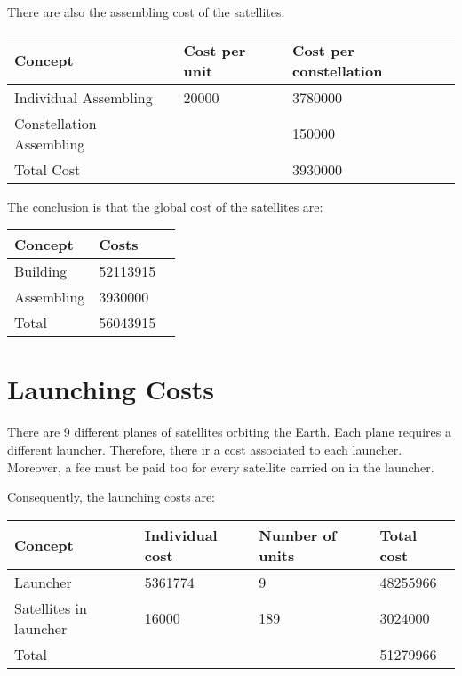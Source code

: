 There are also the assembling cost of the satellites:


\begin{center}
\begin{tabular}{ | l | l | l | }
\toprule
\hline
\rowcolor[gray]{0.75}
	Concept & Cost per unit & Cost per constellation \\ \hline
	Individual Assembling & 20000 & 3780000 \\ \hline
	Constellation Assembling &  & 150000 \  \\ \hline
	\rowcolor[gray]{0.65}
	Total Cost &  & 3930000 \  \\ \hline
	\bottomrule
\end{tabular}
\end{center}

The conclusion is that the global cost of the satellites are:
\begin{center}
\begin{tabular}{ | l | l | }
\toprule
\hline
\rowcolor[gray]{0.75}
	Concept & Costs  \ \\ \hline
	Building & 52113915 \\ \hline
	Assembling & 3930000 \\ \hline
	\rowcolor[gray]{0.65}
	Total & 56043915 \ \\ \hline
	\bottomrule
\end{tabular}
\end{center}



\section{Launching Costs}
There are 9 different planes of satellites orbiting the Earth. Each plane requires a different launcher. Therefore, there ir a cost associated to each launcher. Moreover, a fee must be paid too for every satellite carried on in the launcher. 

Consequently, the launching costs are:

\begin{center}
\begin{tabular}{ | l | l | l | l | }
\toprule
\hline
\rowcolor[gray]{0.75}
	Concept & Individual cost & Number of units & Total cost \\ \hline
	Launcher & 5361774 & 9 & 48255966 \\ \hline
	Satellites in launcher & 16000 & 189 & 3024000 \\ \hline
	\rowcolor[gray]{0.65}
	Total &  &  & 51279966 \\ \hline
\end{tabular}
\end{center}



